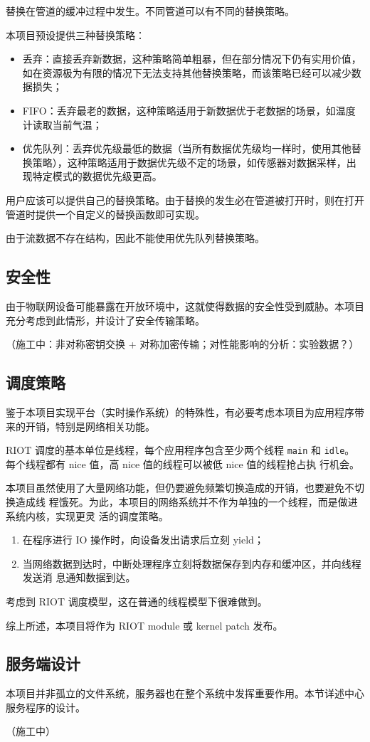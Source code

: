 \documentclass{ctexart}
\begin{document}
替换在管道的缓冲过程中发生。不同管道可以有不同的替换策略。

本项目预设提供三种替换策略：
\begin{itemize}
	\item 丢弃：直接丢弃新数据，这种策略简单粗暴，但在部分情况下仍有实用价值，如在资源极为有限的情况下无法支持其他替换策略，而该策略已经可以减少数据损失；
	\item FIFO：丢弃最老的数据，这种策略适用于新数据优于老数据的场景，如温度计读取当前气温；
	\item 优先队列：丢弃优先级最低的数据（当所有数据优先级均一样时，使用其他替换策略），这种策略适用于数据优先级不定的场景，如传感器对数据采样，出现特定模式的数据优先级更高。
\end{itemize}
用户应该可以提供自己的替换策略。由于替换的发生必在管道被打开时，则在打开管道时提供一个自定义的替换函数即可实现。

由于流数据不存在结构，因此不能使用优先队列替换策略。

\subsection{安全性}
\label{design-security}
由于物联网设备可能暴露在开放环境中，这就使得数据的安全性受到威胁。本项目充分考虑到此情形，并设计了安全传输策略。

（施工中：非对称密钥交换 + 对称加密传输；对性能影响的分析：实验数据？）

\subsection{调度策略}
鉴于本项目实现平台（实时操作系统）的特殊性，有必要考虑本项目为应用程序带来的开销，特别是网络相关功能。

RIOT 调度的基本单位是线程，每个应用程序包含至少两个线程 \verb|main| 和
\verb|idle|。每个线程都有 nice 值，高 nice 值的线程可以被低 nice 值的线程抢占执
行机会。

本项目虽然使用了大量网络功能，但仍要避免频繁切换造成的开销，也要避免不切换造成线
程饿死。为此，本项目的网络系统并不作为单独的一个线程，而是做进系统内核，实现更灵
活的调度策略。
\begin{enumerate}
\item 在程序进行 IO 操作时，向设备发出请求后立刻 yield；
\item 当网络数据到达时，中断处理程序立刻将数据保存到内存和缓冲区，并向线程发送消
  息通知数据到达。
\end{enumerate}
考虑到 RIOT 调度模型，这在普通的线程模型下很难做到。

综上所述，本项目将作为 RIOT module 或 kernel patch 发布。

\subsection{服务端设计}
本项目并非孤立的文件系统，服务器也在整个系统中发挥重要作用。本节详述中心服务程序的设计。

（施工中）
\end{document}
